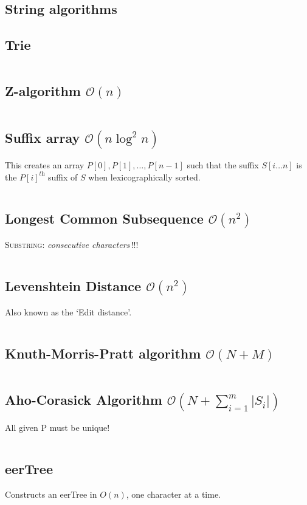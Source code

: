 \documentclass[8pt,a4paper,landscape,oneside]{amsart}
\newcommand{\mintedstyle}[2]{\inputminted[fontsize=\normalsize,baselinestretch=.9,breaklines,tabsize=2]{#1}{code/#2}}
\newcommand{\code}[1]{\mintedstyle{cpp}{#1}}
\begin{document}
\begin{multicols*}{3}
\section{String algorithms}
\subsection{Trie}
\code{strings/trie.cpp}

\subsection{Z-algorithm $\mathcal{O}(n)$}
\code{strings/z_function.cpp}

\subsection{Suffix array $\mathcal{O}(n \log^2{n})$}
This creates an array $P[0], P[1], \dots, P[n-1]$ such that the suffix $S[i \dots n]$ is the $P[i]^\textit{th}$ suffix of $S$ when lexicographically sorted.
\code{strings/suffixarray.cpp}

\subsection{Longest Common Subsequence $\mathcal{O}(n^{2})$}
\textsc{Substring}: \textit{consecutive characters}\,!!!
\code{strings/lcs.cpp}

\subsection{Levenshtein Distance $\mathcal{O}(n^{2})$}
Also known as the `Edit distance'.
\code{strings/edit_dist.cpp}

\subsection{Knuth-Morris-Pratt algorithm $\mathcal{O}(N + M)$}
\code{strings/kmp.cpp}

\subsection{Aho-Corasick Algorithm $\mathcal{O}(N + \sum_{i=1}^{m} |S_i|)$}
All given P must be unique!
\code{strings/aho_corasick.cpp}

\subsection{eerTree}
Constructs an eerTree in $O(n)$, one character at a time.
\code{strings/eertree.cpp}


\end{multicols*}
\end{document}

